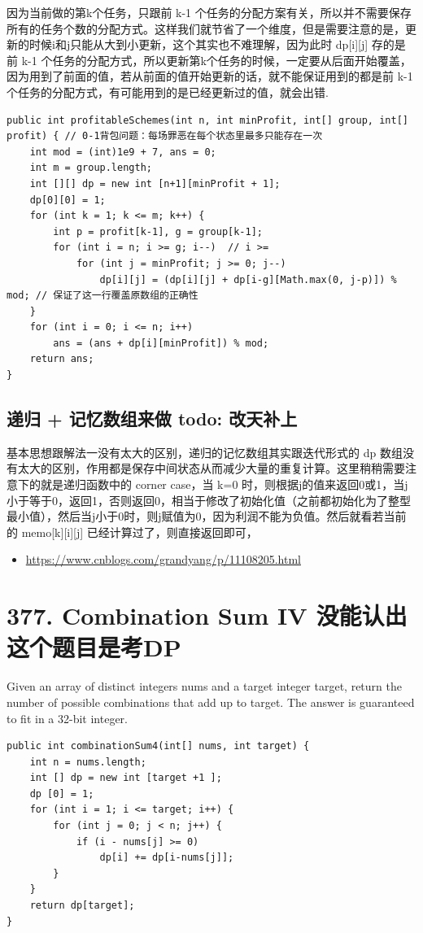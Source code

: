 \documentclass[9pt, b5paaper]{book}
\begin{document}
因为当前做的第k个任务，只跟前 k-1 个任务的分配方案有关，所以并不需要保存所有的任务个数的分配方式。这样我们就节省了一个维度，但是需要注意的是，更新的时候i和j只能从大到小更新，这个其实也不难理解，因为此时 dp[i][j] 存的是前 k-1 个任务的分配方式，所以更新第k个任务的时候，一定要从后面开始覆盖，因为用到了前面的值，若从前面的值开始更新的话，就不能保证用到的都是前 k-1 个任务的分配方式，有可能用到的是已经更新过的值，就会出错.
\begin{verbatim}
public int profitableSchemes(int n, int minProfit, int[] group, int[] profit) { // 0-1背包问题：每场罪恶在每个状态里最多只能存在一次
    int mod = (int)1e9 + 7, ans = 0;
    int m = group.length;
    int [][] dp = new int [n+1][minProfit + 1]; 
    dp[0][0] = 1;
    for (int k = 1; k <= m; k++) {
        int p = profit[k-1], g = group[k-1];
        for (int i = n; i >= g; i--)  // i >= 
            for (int j = minProfit; j >= 0; j--) 
                dp[i][j] = (dp[i][j] + dp[i-g][Math.max(0, j-p)]) % mod; // 保证了这一行覆盖原数组的正确性
    }
    for (int i = 0; i <= n; i++) 
        ans = (ans + dp[i][minProfit]) % mod;
    return ans;
}
\end{verbatim}
\subsection{递归 + 记忆数组来做 todo: 改天补上}
\label{sec-2-26-3}

基本思想跟解法一没有太大的区别，递归的记忆数组其实跟迭代形式的 dp 数组没有太大的区别，作用都是保存中间状态从而减少大量的重复计算。这里稍稍需要注意下的就是递归函数中的 corner case，当 k=0 时，则根据j的值来返回0或1，当j小于等于0，返回1，否则返回0，相当于修改了初始化值（之前都初始化为了整型最小值），然后当j小于0时，则j赋值为0，因为利润不能为负值。然后就看若当前的 memo[k][i][j] 已经计算过了，则直接返回即可，
\begin{itemize}
\item \url{https://www.cnblogs.com/grandyang/p/11108205.html}
\end{itemize}

\section{377. Combination Sum IV 没能认出这个题目是考DP}
\label{sec-2-27}
Given an array of distinct integers nums and a target integer target, return the number of possible combinations that add up to target.
The answer is guaranteed to fit in a 32-bit integer.
\begin{verbatim}
public int combinationSum4(int[] nums, int target) {
    int n = nums.length;
    int [] dp = new int [target +1 ];
    dp [0] = 1;
    for (int i = 1; i <= target; i++) {
        for (int j = 0; j < n; j++) {
            if (i - nums[j] >= 0)
                dp[i] += dp[i-nums[j]];
        }
    }
    return dp[target];
}
\end{verbatim}
\end{document}
